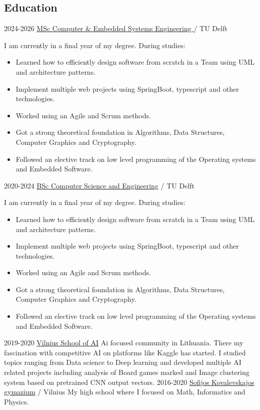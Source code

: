 \documentclass{article}
\begin{document}
\subsection{Education}
\cvitem
{2024-2026}
{\href{https://www.tudelft.nl/onderwijs/opleidingen/masters/cese/msc-computer-embedded-systems-engineering}{MSc Computer \& Embedded Systems Engineering }}
{/ TU Delft}
{I am currently in a final year of my degree. During studies: 
\begin{itemize}
\setlength\itemsep{0.25em}
\item Learned how to efficiently design software from scratch in a Team using UML and architecture patterns. 
\item Implement multiple web projects using SpringBoot, typescript and other technologies.
\item Worked using an Agile and Scrum methods. 
\item Got a strong theoretical foundation in Algorithms, Data Structures, Computer Graphics and Cryptography. 
\item Followed an elective track on low level programming of the Operating systems and Embedded Software.
\end{itemize}
}
\cvitem
{2020-2024}
{\href{https://www.tudelft.nl/onderwijs/opleidingen/bachelors/cse/bsc-computer-science-and-engineering}{BSc Computer Science and Engineering}}
{/ TU Delft}
{I am currently in a final year of my degree. During studies: 
\begin{itemize}
\setlength\itemsep{0.25em}
\item Learned how to efficiently design software from scratch in a Team using UML and architecture patterns. 
\item Implement multiple web projects using SpringBoot, typescript and other technologies.
\item Worked using an Agile and Scrum methods. 
\item Got a strong theoretical foundation in Algorithms, Data Structures, Computer Graphics and Cryptography. 
\item Followed an elective track on low level programming of the Operating systems and Embedded Software.
\end{itemize}
}
\cvitem
{2019-2020}
{\href{https://www.linkedin.com/school/vilnius-school-of-ai/?originalSubdomain=lt}{Vilnius School of AI}}
{}
{Ai focused community in Lithuania. There my fascination with competitive AI on platforms like Kaggle has started. I studied topics ranging from Data science to Deep learning and developed multiple AI related projects including analysis of Board games marked and Image clustering system based on pretrained CNN output vectors.}
\cvitem
{2016-2020}
{\href{https://skg.lt/}{Sofijos Kovalevskajos gymazium}}
{/ Vilnius}
{My high school where I focused on Math, Informatics and Physics.}
\end{document}
